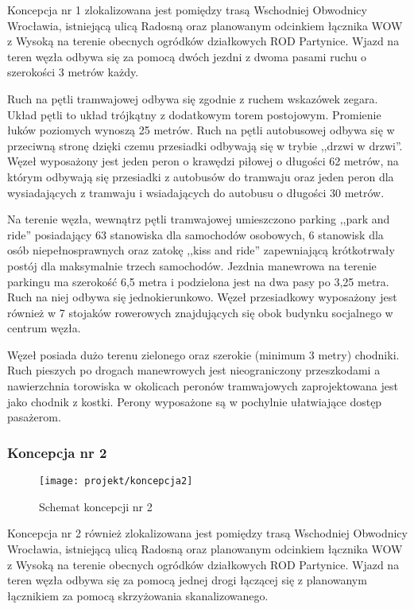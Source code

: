 \documentclass[twoside,12pt]{article}
\begin{document}
		Koncepcja nr 1 zlokalizowana jest pomiędzy trasą Wschodniej Obwodnicy Wrocławia, istniejącą ulicą Radosną oraz planowanym odcinkiem łącznika WOW z Wysoką na terenie obecnych ogródków działkowych ROD Partynice. Wjazd na teren węzła odbywa się za pomocą dwóch jezdni z dwoma pasami ruchu o szerokości 3 metrów każdy. 
		
		Ruch na pętli tramwajowej odbywa się zgodnie z ruchem wskazówek zegara. Układ pętli to układ trójkątny z dodatkowym torem postojowym. Promienie łuków poziomych wynoszą 25 metrów. Ruch na pętli autobusowej odbywa się w przeciwną stronę dzięki czemu przesiadki odbywają się w trybie ,,drzwi w drzwi''. Węzeł wyposażony jest jeden peron o krawędzi piłowej o długości 62 metrów, na którym odbywają się przesiadki z autobusów do tramwaju oraz jeden peron dla wysiadających z tramwaju i wsiadających do autobusu o długości 30 metrów. 
		
		Na terenie węzła, wewnątrz pętli tramwajowej umieszczono parking ,,park and ride'' posiadający 63 stanowiska dla samochodów osobowych, 6 stanowisk dla osób niepełnosprawnych oraz zatokę ,,kiss and ride'' zapewniającą krótkotrwały postój dla maksymalnie trzech samochodów. Jezdnia manewrowa na terenie parkingu ma szerokość 6,5 metra i podzielona jest na dwa pasy po 3,25 metra. Ruch na niej odbywa się jednokierunkowo. Węzeł przesiadkowy wyposażony jest również w 7 stojaków rowerowych znajdujących się obok budynku socjalnego w centrum węzła.
		
		Węzeł posiada dużo terenu zielonego oraz szerokie (minimum 3 metry) chodniki. Ruch pieszych po drogach manewrowych jest nieograniczony przeszkodami a nawierzchnia torowiska w okolicach peronów tramwajowych zaprojektowana jest jako chodnik z kostki. Perony wyposażone są w pochylnie ułatwiające dostęp pasażerom. 
		
	\subsubsection{Koncepcja nr 2}
	
		\begin{figure}[H]
		\centering
		\texttt{[image: projekt/koncepcja2]}
		\caption{Schemat koncepcji nr 2}
		
		\end{figure}
		
		Koncepcja nr 2 również zlokalizowana jest pomiędzy trasą Wschodniej Obwodnicy Wrocławia, istniejącą ulicą Radosną oraz planowanym odcinkiem łącznika WOW z Wysoką na terenie obecnych ogródków działkowych ROD Partynice. Wjazd na teren węzła odbywa się za pomocą jednej drogi łączącej się z planowanym łącznikiem za pomocą skrzyżowania skanalizowanego.
		
\end{document}
